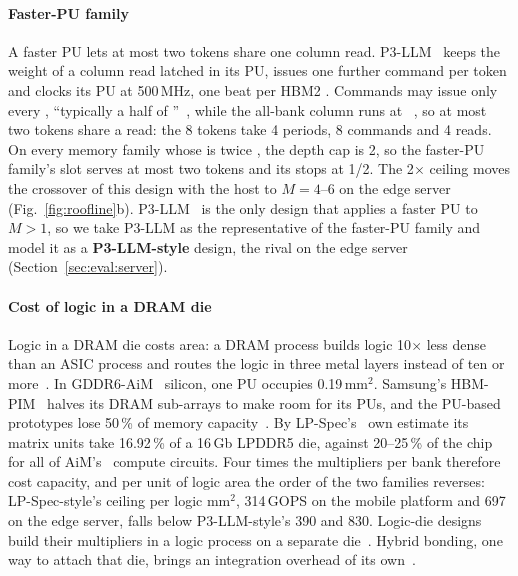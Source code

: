 \paragraph{Faster-PU family}
A faster PU lets at most two tokens share one column read. P3-LLM~\cite{p3llm} keeps the weight of a column read
latched in its PU, issues one further command per token and clocks its PU at 500\,MHz, one beat per HBM2 \tccds.
Commands may issue only every \tccds, ``typically a half of \tccdl{}''~\cite{p3llm}, while the all-bank column runs at
\tccdl~\cite{hbmpim}, so at most two tokens share a read: the 8 tokens take 4 periods, 8 commands and 4 reads. On
every memory family whose \tccdl{} is twice \tccds{}, the depth cap is 2, so the faster-PU family's slot serves at
most two tokens and its \UMAC stops at 1/2. The 2$\times$ ceiling moves the crossover of
this design with the host to $M = 4$--6 on the edge server (Fig.~\ref{fig:roofline}b). P3-LLM~\cite{p3llm} is the only
design that applies a faster PU to $M > 1$, so we take P3-LLM as the representative of the faster-PU family and model
it as a \textbf{P3-LLM-style} design, the rival on the edge server (Section~\ref{sec:eval:server}).

\begin{table}[t]
  \caption{Design parameters per platform, with logic area (mm$^2$) and ungated peak power (mW).}
  \label{tab:params}
  \centering
  \footnotesize
  \setlength{\tabcolsep}{2.2pt}
  
\end{table}

\paragraph{Cost of logic in a DRAM die}
Logic in a DRAM die costs area: a DRAM process builds logic 10$\times$ less dense than an ASIC process and routes the
logic in three metal layers instead of ten or more~\cite{devaux}. In GDDR6-AiM~\cite{aimjssc} silicon, one PU occupies
0.19\,mm$^2$. Samsung's HBM-PIM~\cite{hbmpim} halves its DRAM sub-arrays to make room for its PUs, and the PU-based
prototypes lose 50\,\% of memory capacity~\cite{pimpal}. By LP-Spec's~\cite{lpspec} own estimate its matrix units take
16.92\,\% of a 16\,Gb LPDDR5 die, against 20--25\,\% of the chip for all of AiM's~\cite{aimjssc} compute circuits.
Four times the multipliers per bank therefore cost capacity, and per unit of logic area the order of the two families
reverses: LP-Spec-style's ceiling per logic mm$^2$, 314\,GOPS on the mobile platform and 697 on the edge server, falls
below P3-LLM-style's 390 and 830. Logic-die designs build their multipliers in a logic process on a separate
die~\cite{duplex,h2llm}. Hybrid bonding, one way to attach that die, brings an integration overhead of its
own~\cite{h2llm}.

